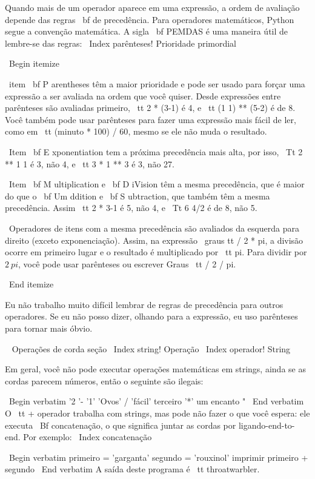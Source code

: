 \documentclass[10pt]{book}
\begin{document}
{Quando mais de um operador aparece em uma expressão, a ordem de
avaliação depende das regras {\ bf de precedência}. Para
operadores matemáticos, Python segue a convenção matemática.
A sigla {\ bf PEMDAS} é uma maneira útil de
lembre-se das regras:
\ Index {parênteses! Prioridade primordial}

\ Begin {itemize}

\ item {\ bf P} arentheses têm a maior prioridade e pode ser usado 
para forçar uma expressão a ser avaliada na ordem que você quiser. Desde
expressões entre parênteses são avaliadas primeiro, {\ tt 2 * (3-1)} é 4,
e {\ tt (1 1) ** (5-2)} é de 8. Você também pode usar parênteses para fazer uma
expressão mais fácil de ler, como em {\ tt (minuto * 100) / 60}, mesmo
se ele não muda o resultado.

\ Item {\ bf E} xponentiation tem a próxima precedência mais alta, por isso,
{\ Tt 2 ** 1 1} é 3, não 4, e {\ tt 3 * 1 ** 3} é 3, não 27.

\ Item {\ bf M} ultiplication e {\ bf D} iVision têm a mesma precedência,
que é maior do que o {\ bf Um ddition} e {\ bf S} ubtraction, que também
têm a mesma precedência. Assim {\ tt 2 * 3-1} é 5, não 4, e
{\ Tt 6 4/2} é de 8, não 5.

\ Operadores de itens com a mesma precedência são avaliados da esquerda para
  direito (exceto exponenciação). Assim, na expressão {\ graus tt /
    2 * pi}, a divisão ocorre em primeiro lugar e o resultado é multiplicado
  por {\ tt pi}. Para dividir por $ 2 \ pi $, você pode usar parênteses ou escrever
  {Graus \ tt / 2 / pi}.

\ End {itemize}

Eu não trabalho muito difícil lembrar de regras de precedência para outros
operadores. Se eu não posso dizer, olhando para a expressão, eu uso
parênteses para tornar mais óbvio.

\ {} Operações de corda seção
\ Index {string! Operação}
\ Index {operador! String}

Em geral, você não pode executar operações matemáticas em strings, ainda
se as cordas parecem números, então o seguinte são ilegais:

\ Begin {verbatim}
'2 '- '1' 'Ovos' / 'fácil' terceiro '*' um encanto "
\ End {verbatim}
%
O {\ tt +} operador trabalha com strings, mas
pode não fazer o que você espera: ele executa
{\ Bf concatenação}, o que significa juntar as cordas por
ligando-end-to-end. Por exemplo:
\ Index {concatenação}

\ Begin {verbatim}
primeiro = 'garganta'
segundo = 'rouxinol'
imprimir primeiro + segundo
\ End {verbatim}
%
A saída deste programa é {\ tt throatwarbler}.

}
\end{document}
